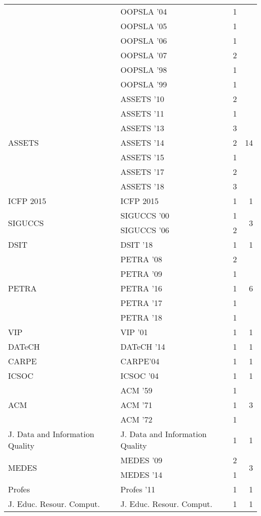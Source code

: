 \begin{table*}[t]
\begin{tabular}{llrr}
& OOPSLA '04 & 1 &\\
& OOPSLA '05 & 1 &\\
& OOPSLA '06 & 1 &\\
& OOPSLA '07 & 2 &\\
& OOPSLA '98 & 1 &\\
& OOPSLA '99 & 1 &\\
\multirow{7}{*}{ASSETS } & ASSETS '10 & 2 & \multirow{7}{*}{14}\\
& ASSETS '11 & 1 &\\
& ASSETS '13 & 3 &\\
& ASSETS '14 & 2 &\\
& ASSETS '15 & 1 &\\
& ASSETS '17 & 2 &\\
& ASSETS '18 & 3 &\\
\multirow{1}{*}{ICFP 2015} & ICFP 2015 & 1 & \multirow{1}{*}{1}\\
\multirow{2}{*}{SIGUCCS } & SIGUCCS '00 & 1 & \multirow{2}{*}{3}\\
& SIGUCCS '06 & 2 &\\
\multirow{1}{*}{DSIT } & DSIT '18 & 1 & \multirow{1}{*}{1}\\
\multirow{5}{*}{PETRA } & PETRA '08 & 2 & \multirow{5}{*}{6}\\
& PETRA '09 & 1 &\\
& PETRA '16 & 1 &\\
& PETRA '17 & 1 &\\
& PETRA '18 & 1 &\\
\multirow{1}{*}{VIP } & VIP '01 & 1 & \multirow{1}{*}{1}\\
\multirow{1}{*}{DATeCH } & DATeCH '14 & 1 & \multirow{1}{*}{1}\\
\multirow{1}{*}{CARPE} & CARPE'04 & 1 & \multirow{1}{*}{1}\\
\multirow{1}{*}{ICSOC } & ICSOC '04 & 1 & \multirow{1}{*}{1}\\
\multirow{3}{*}{ACM } & ACM '59 & 1 & \multirow{3}{*}{3}\\
& ACM '71 & 1 &\\
& ACM '72 & 1 &\\
\multirow{1}{*}{J. Data and Information Quality} & J. Data and Information Quality & 1 & \multirow{1}{*}{1}\\
\multirow{2}{*}{MEDES } & MEDES '09 & 2 & \multirow{2}{*}{3}\\
& MEDES '14 & 1 &\\
\multirow{1}{*}{Profes } & Profes '11 & 1 & \multirow{1}{*}{1}\\
\multirow{1}{*}{J. Educ. Resour. Comput.} & J. Educ. Resour. Comput. & 1 & \multirow{1}{*}{1}\\

\end{tabular}
\end{table*}
